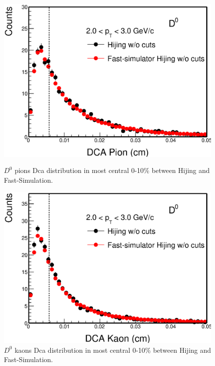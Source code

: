 \documentclass[a4paper]{article}
\begin{document}
\begin{figure}[htbp]
\begin{minipage}[htbp]{0.52\linewidth}
\centering
\includegraphics[width=1.0\textwidth,angle=0]{fig/HijingdcaPions.eps}
\caption{ $D^0$ pions Dca distribution in most central 0-10\% between Hijing and Fast-Simulation.\label{HijingdcaPions}}
\end{minipage}
\hfill
\begin{minipage}[htbp]{0.52\linewidth}
\centering
\includegraphics[width=1.0\textwidth,angle=0]{fig/HijingdcaKaons.eps} 
\caption{ $D^0$ kaons Dca distribution in most central 0-10\% between Hijing and Fast-Simulation.\label{HijingdcaKaons}}
\end{minipage}
\end{figure}
\end{document}
